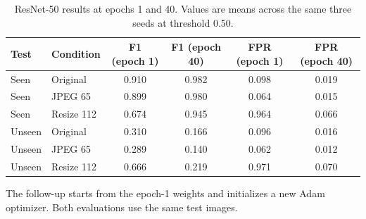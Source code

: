 \begin{table}[!htbp]\centering\resulttable
\caption{ResNet-50 results at epochs 1 and 40. Values are means across the same three seeds at threshold 0.50.}\label{tab:epochs}
\begin{tabularx}{\linewidth}{@{}llCCCC@{}}\toprule
Test & Condition & F1 (epoch 1) & F1 (epoch 40) & FPR (epoch 1) & FPR (epoch 40)\\\midrule
Seen & Original & 0.910 & 0.982 & 0.098 & 0.019\\
Seen & JPEG 65 & 0.899 & 0.980 & 0.064 & 0.015\\
Seen & Resize 112 & 0.674 & 0.945 & 0.964 & 0.066\\
Unseen & Original & 0.310 & 0.166 & 0.096 & 0.016\\
Unseen & JPEG 65 & 0.289 & 0.140 & 0.062 & 0.012\\
Unseen & Resize 112 & 0.666 & 0.219 & 0.971 & 0.070\\
\bottomrule\end{tabularx}
\par\smallskip\parbox{\linewidth}{\footnotesize The follow-up starts from the epoch-1 weights and initializes a new Adam optimizer. Both evaluations use the same test images.}
\end{table}
